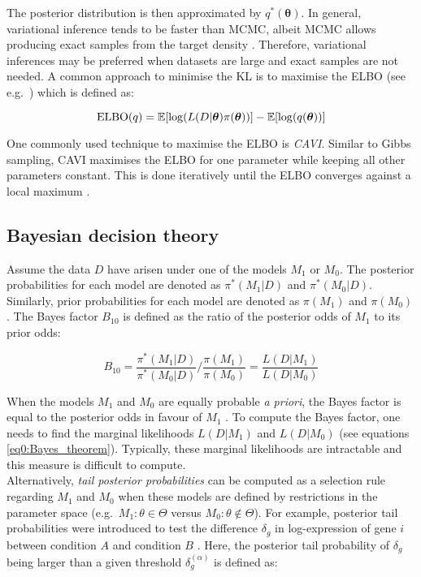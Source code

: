 The posterior distribution is then approximated by $q^\ast(\bm{\theta})$\citep{Blei2017}. In general, variational inference tends to be faster than MCMC, albeit MCMC allows producing exact samples from the target density \citep{Blei2017}. Therefore, variational inferences may be preferred when datasets are large and exact samples are not needed. A common approach to minimise the KL is to maximise the \gls{ELBO} (see e.g.~\citep{Beal2003}) which is defined as:

\begin{equation}
\textnormal{ELBO}(q)=\mathbb{E}[\log(L(D|\bm{\theta})\pi(\bm{\theta}))] - \mathbb{E}[\log(q(\bm{\theta}))]
\end{equation}

One commonly used technique to maximise the ELBO is \emph{\gls{CAVI}}. Similar to Gibbs sampling, CAVI maximises the ELBO for one parameter while keeping all other parameters constant. This is done iteratively until the ELBO converges against a local maximum \citep{Blei2017}. 

\subsection{Bayesian decision theory} \label{sec0:decision}

Assume the data $D$ have arisen under one of the models $M_1$ or $M_0$. The posterior probabilities for each model are denoted as $\pi^*(M_1|D)$ and $\pi^*(M_0|D)$. Similarly, prior probabilities for each model are denoted as $\pi(M_1)$ and $\pi(M_0)$. The Bayes factor $B_{10}$ \citep{Jeffreys1961} is defined as the ratio of the posterior odds of $M_1$ to its prior odds:

\begin{equation}
B_{10}=\frac{\pi^*(M_1|D)}{\pi^*(M_0|D)}/{}\frac{\pi(M_1)}{\pi(M_0)}=\frac{L(D|M_1)}{L(D|M_0)}
\end{equation}  

When the models $M_1$ and $M_0$ are equally probable \emph{a priori}, the Bayes factor is equal to the posterior odds in favour of $M_1$ \citep{Kass1995}. To compute the Bayes factor, one needs to find the marginal likelihoods $L(D|M_1)$ and $L(D|M_0)$ (see equations \eqref{eq0:Bayes_theorem}). Typically, these marginal likelihoods are intractable and this measure is difficult to compute. \\

Alternatively, \emph{tail posterior probabilities} can be computed as a selection rule regarding $M_1$ and $M_0$ when these models are defined by restrictions in the parameter space (e.g.~$M_1:\theta\in\Theta$ versus $M_0:\theta\notin\Theta$). For example, posterior tail probabilities were introduced to test the difference $\delta_g$ in log-expression of gene $i$ between condition $A$ and condition $B$ \citep{Bochkina2007}. Here, the posterior tail probability of $\delta_g$ being larger than a given threshold $\delta_g^{(\alpha)}$ is defined as:

